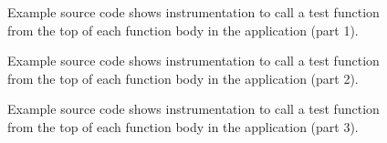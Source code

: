 \begin{figure}[!h]
{\indent
{\mySmallestFontSize

\label{Tutorial:exampleCodeCoverage}

\begin{latexonly}
%  
   
\end{latexonly}

\begin{htmlonly}
   
\end{htmlonly}

}
}
\caption{Example source code shows instrumentation to call a test function from the top of
         each function body in the application (part 1).}
\end{figure}

\begin{figure}[!h]
{\indent
{\mySmallestFontSize

\label{Tutorial:exampleCodeCoverage2}

\begin{latexonly}
   
\end{latexonly}

\begin{htmlonly}
%   
\end{htmlonly}

}
}
\caption{Example source code shows instrumentation to call a test function from the top of
         each function body in the application (part 2).}
\end{figure}

\begin{figure}[!h]
{\indent
{\mySmallestFontSize

\label{Tutorial:exampleCodeCoverage2}

\begin{latexonly}
   
\end{latexonly}

\begin{htmlonly}
%   
\end{htmlonly}

}
}
\caption{Example source code shows instrumentation to call a test function from the top of
         each function body in the application (part 3).}
\end{figure}

